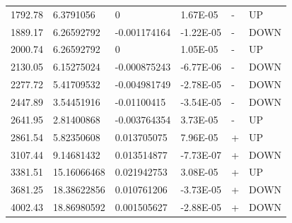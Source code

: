 \documentclass{article}
\begin{document}
\begin{table}[]
\begin{tabular}{@{}llllll@{}}
1792.78      & 6.3791056        & 0                & 1.67E-05  & -    & UP      \\
1889.17      & 6.26592792       & -0.001174164     & -1.22E-05 & -    & DOWN    \\
2000.74      & 6.26592792       & 0                & 1.05E-05  & -    & UP      \\
2130.05      & 6.15275024       & -0.000875243     & -6.77E-06 & -    & DOWN    \\
2277.72      & 5.41709532       & -0.004981749     & -2.78E-05 & -    & DOWN    \\
2447.89      & 3.54451916       & -0.01100415      & -3.54E-05 & -    & DOWN    \\
2641.95      & 2.81400868       & -0.003764354     & 3.73E-05  & -    & UP      \\
2861.54      & 5.82350608       & 0.013705075      & 7.96E-05  & +    & UP      \\
3107.44      & 9.14681432       & 0.013514877      & -7.73E-07 & +    & DOWN    \\
3381.51      & 15.16066468      & 0.021942753      & 3.08E-05  & +    & UP      \\
3681.25      & 18.38622856      & 0.010761206      & -3.73E-05 & +    & DOWN    \\
4002.43      & 18.86980592      & 0.001505627      & -2.88E-05 & +    & DOWN    \\ \bottomrule
\end{tabular}
\end{table}
\end{document}
